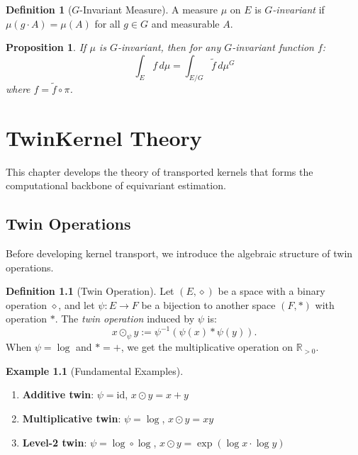 \documentclass[11pt,twoside,openright]{book}
\theoremstyle{plain}
\newtheorem{proposition}[theorem]{Proposition}
\theoremstyle{definition}
\newtheorem{definition}[theorem]{Definition}
\newtheorem{example}[theorem]{Example}
\theoremstyle{remark}
\newcommand{\Rd}{\mathbb{R}}
\newcommand{\twin}{\odot}
\begin{document}
\begin{definition}[$G$-Invariant Measure]
A measure $\mu$ on $E$ is \emph{$G$-invariant} if $\mu(g \cdot A) = \mu(A)$ for all $g \in G$ and measurable $A$.
\end{definition}

\begin{proposition}
If $\mu$ is $G$-invariant, then for any $G$-invariant function $f$:
\[
\int_E f \, d\mu = \int_{E/G} \tilde{f} \, d\mu^G
\]
where $f = \tilde{f} \circ \pi$.
\end{proposition}


\chapter{TwinKernel Theory}
\label{ch:twinkernel}

This chapter develops the theory of transported kernels that forms the computational backbone of equivariant estimation.

\section{Twin Operations}

Before developing kernel transport, we introduce the algebraic structure of twin operations.

\begin{definition}[Twin Operation]
Let $(E, \diamond)$ be a space with a binary operation $\diamond$, and let $\psi : E \to F$ be a bijection to another space $(F, *)$ with operation $*$. The \emph{twin operation} induced by $\psi$ is:
\begin{equation}
x \twin_\psi y := \psi^{-1}(\psi(x) * \psi(y)).
\label{eq:twin-op}
\end{equation}
When $\psi = \log$ and $* = +$, we get the multiplicative operation on $\Rd_{>0}$.
\end{definition}

\begin{example}[Fundamental Examples]
\begin{enumerate}
\item \textbf{Additive twin}: $\psi = \text{id}$, $x \twin y = x + y$
\item \textbf{Multiplicative twin}: $\psi = \log$, $x \twin y = xy$
\item \textbf{Level-2 twin}: $\psi = \log \circ \log$, $x \twin y = \exp(\log x \cdot \log y)$
\end{enumerate}
\end{example}
\end{document}
